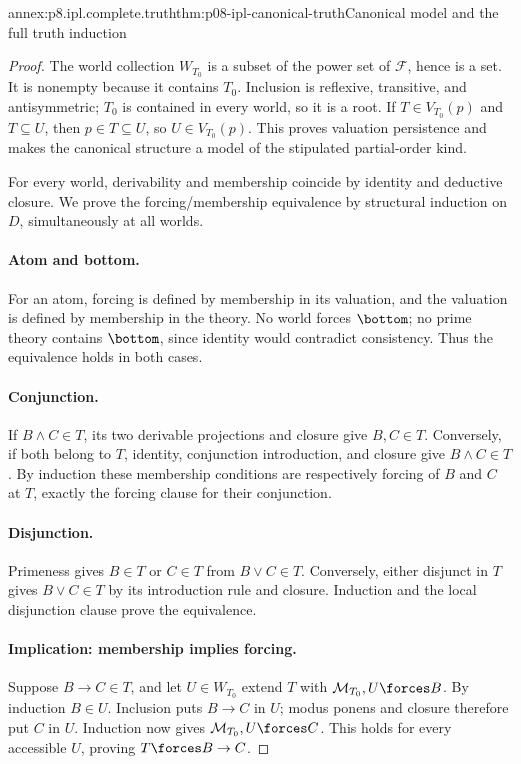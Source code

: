 \begin{annexitem}{annex:p8.ipl.complete.truth}{thm:p08-ipl-canonical-truth}{Canonical model and the full truth induction}
\begin{proof}
The world collection \(W_{T_0}\) is a subset of the power set of
\(\mathcal F\), hence is a set. It is nonempty because it contains
\(T_0\). Inclusion is reflexive, transitive, and antisymmetric;
\(T_0\) is contained in every world, so it is a root. If
\(T\in V_{T_0}(p)\) and \(T\subseteq U\), then \(p\in T\subseteq U\),
so \(U\in V_{T_0}(p)\). This proves valuation persistence and makes
the canonical structure a model of the stipulated partial-order kind.

For every world, derivability and membership coincide by identity and
deductive closure. We prove the forcing/membership equivalence by
structural induction on \(D\), simultaneously at all worlds.

\paragraph{Atom and bottom.}
For an atom, forcing is defined by membership in its valuation, and the
valuation is defined by membership in the theory. No world forces
\(\bottom\); no prime theory contains \(\bottom\), since identity
would contradict consistency. Thus the equivalence holds in both cases.

\paragraph{Conjunction.}
If \(B\land C\in T\), its two derivable projections and closure
give \(B,C\in T\). Conversely, if both belong to \(T\), identity,
conjunction introduction, and closure give \(B\land C\in T\).
By induction these membership conditions are respectively forcing of
\(B\) and \(C\) at \(T\), exactly the forcing clause for their
conjunction.

\paragraph{Disjunction.}
Primeness gives \(B\in T\) or \(C\in T\) from \(B\lor C\in T\).
Conversely, either disjunct in \(T\) gives \(B\lor C\in T\) by
its introduction rule and closure. Induction and the local disjunction
clause prove the equivalence.

\paragraph{Implication: membership implies forcing.}
Suppose \(B\to C\in T\), and let \(U\in W_{T_0}\) extend \(T\)
with \(\mathcal M_{T_0},U\forces B\). By induction \(B\in U\).
Inclusion puts \(B\to C\) in \(U\); modus ponens and closure
therefore put \(C\) in \(U\). Induction now gives
\(\mathcal M_{T_0},U\forces C\). This holds for every accessible
\(U\), proving \(T\forces B\to C\).


\end{proof}
\end{annexitem}
